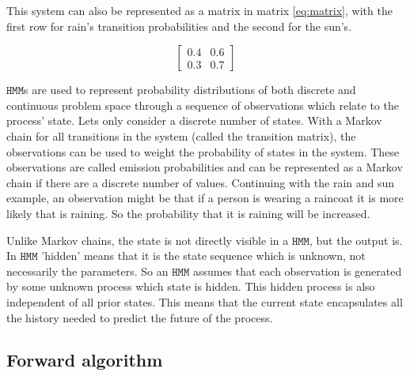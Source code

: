 \documentclass[12pt, a4paper]{article}
\newcommand{\HMM}[0]{%
  \mathtt{HMM}
}
\begin{document}
This system can also be represented as a matrix in matrix \ref{eq:matrix}, with the first row for rain's transition probabilities and the second for the sun's.

\begin{equation}\label{eq:matrix}
\begin{bmatrix}
       0.4 & 0.6\\
       0.3 & 0.7
\end{bmatrix}
\end{equation}

$\HMM$s are used to represent probability distributions of both discrete and continuous problem space through a sequence of observations which relate to the process' state. Lets only consider a discrete number of states. With a Markov chain for all transitions in the system (called the transition matrix), the observations can be used to weight the probability of states in the system. These observations are called  emission probabilities and can be represented as a Markov chain if there are a discrete number of values\cite{hmm}\cite{MA-hmm}. Continuing with the rain and sun example, an observation might be that if a person is wearing a raincoat it is more likely that is raining. So the probability that it is raining will be increased.

Unlike Markov chains, the state is not directly visible in a $\HMM$, but the output is. In $\HMM$ 'hidden' means that it is the state sequence which is unknown, not necessarily the parameters. So an $\HMM$ assumes that each observation is generated by some unknown process which state is hidden. This hidden process is also independent of all prior states. This means that the current state encapsulates all the history needed to predict the future of the process\cite{hmm}\cite{MA-hmm}.


\subsection{Forward algorithm}
\end{document}
